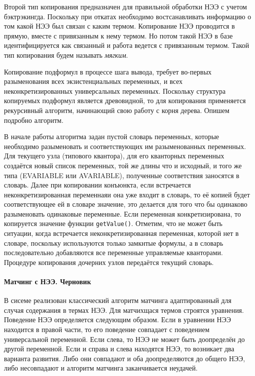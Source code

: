 Второй тип копирования предназначен для правильной обработки НЭЭ с учетом бэктрэкингда. Поскольку при откатах необходимо востсанавливать информацию о том какой НЭЭ был связан с каким термом. Копирование НЭЭ проводится в прямую, вместе с привязанным к нему термом. Но потом такой НЭЭ в базе идентифицируется как связанный и работа ведется с привязанным термом. Такой тип копирования будем называть \emph{мягким}.

Копирование подформул в процессе шага вывода, требует во-первых разыменования всех экзистенциальных переменных, и всех неконкретизированных универсальных переменных. Поскольку структура копируемых подформул является древовидной, то для копирования применяется рекурсивный алгоритм, начинающий свою работу с корня дерева. Опишем подробно алгоритм.

В начале работы алгоритма задан пустой словарь переменных, которые необходимо разыменовать и соответствующих им  разыменованных переменных. Для текущего узла (типового квантора), для его кванторных переменных создаётся новый список переменных, той же длины что и исходный, и того же типа (EVARIABLE или AVARIABLE), полученные соответствия заносятся в словарь. Далее при копировании конъюнкта, если встречается неконкретизированная переменнаяи она уже входит в словарь, то её копией будет соответствующее ей в словаре значение, это делается для того что бы одинаково разыменовать одинаковые переменные. Если переменная конкретизирована, то копируется значение функции {\tt getValue()}. Отметим, что не может быть ситуации, когда встречается неконкретизированная переменная, которой нет в словаре, поскольку используются только замкнтые формулы, а в словарь последовательно добавляются все переменные управляемые кванторами. Процедуре копирования дочерних узлов передаётся текущий словарь.

\paragraph{Матчинг с НЭЭ. Черновик} В сисеме реализован классический алгоритм матчинга адаптированный для случая содержания в термах НЭЭ. Для матчихщася термов строятся уравнения. Поведение НЭЭ определяется следующим образом. Если в уравнении НЭЭ находится в правой части, то его поведение совпадает с поведением универсальной переменной. Если слева, то НЭЭ не может быть доопределён до другой переменной. Если и справа и слева находятся НЭЭ, то возникает два варианта развития. Либо они совпадают и оба доопределяются до общего НЭЭ, либо несовпадают и алгоритм матчинга заканчивается неудачей.

